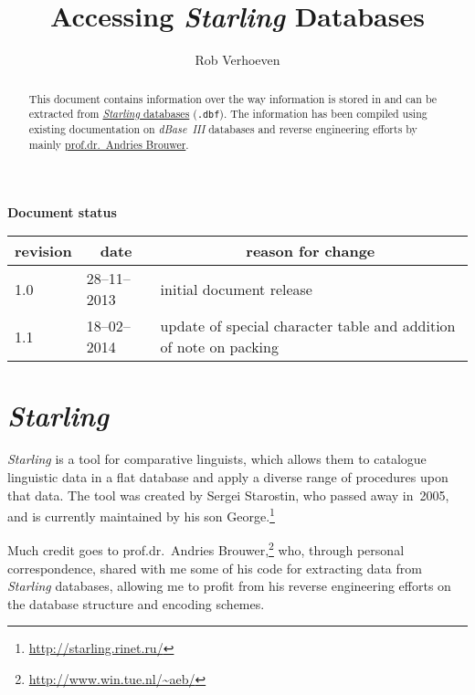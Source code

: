 \documentclass[12pt]{article}
\newcommand{\thead}[1]{\multicolumn{1}{c}{\textbf{#1}}}
\newcommand{\dBaseIII}{\mbox{\emph{dBase~III}}}
\newcommand{\Starling}{\emph{Starling}}
\newcommand{\fileext}[1]{\mbox{\texttt{.#1}}}
\newcommand{\Brouwer}{prof.dr.~Andries Brouwer}
\begin{document}
\author{Rob Verhoeven}
\title{Accessing \Starling{} Databases}

\maketitle

\vfil

\begin{abstract}
This document contains information over the way information is stored in and can be extracted from \href{http://starling.rinet.ru/}{\Starling{} databases} (\fileext{dbf}). The information has been compiled using existing documentation on \dBaseIII{} databases and reverse engineering efforts by mainly \href{http://en.wikipedia.org/wiki/Andries_Brouwer}{\Brouwer}.
\end{abstract}

\vfil
\begin{center}
	\textbf{Document status}\\[1em]
	\begin{tabular}{llp{}}
		\toprule
		\thead{revision} & \thead{date} & \thead{reason for change}\\
		\midrule
		1.0 & 28--11--2013 & initial document release\\
		1.1 & 18--02--2014 & update of special character table and addition of note on packing\\
		\bottomrule
	\end{tabular}
\end{center}


\clearpage
\tableofcontents

\clearpage

\section{\Starling{}}
\Starling{} is a tool for comparative linguists, which allows them to catalogue linguistic data in a flat database and apply a diverse range of procedures upon that data. The tool was created by Sergei Starostin, who passed away in~2005, and is currently maintained by his son George.\footnote{\url{http://starling.rinet.ru/}}

Much credit goes to \Brouwer,\footnote{\url{http://www.win.tue.nl/~aeb/}} who, through personal correspondence, shared with me some of his code for extracting data from \Starling{} databases, allowing me to profit from his reverse engineering efforts on the database structure and encoding schemes.
\end{document}
